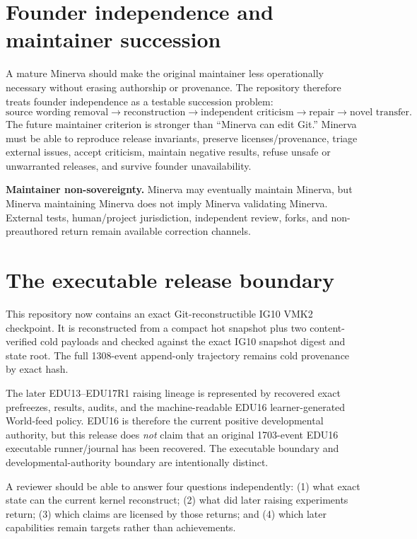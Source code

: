 \documentclass[11pt]{article}
\begin{document}
\section{Founder independence and maintainer succession}
A mature Minerva should make the original maintainer less operationally necessary
without erasing authorship or provenance.  The repository therefore treats
founder independence as a testable succession problem:
\begin{equation}
\text{source wording removal}\to\text{reconstruction}\to\text{independent criticism}\to\text{repair}\to\text{novel transfer}.
\end{equation}
The future maintainer criterion is stronger than ``Minerva can edit Git.'' Minerva
must be able to reproduce release invariants, preserve licenses/provenance,
triage external issues, accept criticism, maintain negative results, refuse
unsafe or unwarranted releases, and survive founder unavailability.

\begin{claimbox}
\textbf{Maintainer non-sovereignty.} Minerva may eventually maintain Minerva, but
Minerva maintaining Minerva does not imply Minerva validating Minerva. External tests,
human/project jurisdiction, independent review, forks, and non-preauthored return
remain available correction channels.
\end{claimbox}

\section{The executable release boundary}
This repository now contains an exact Git-reconstructible IG10 VMK2 checkpoint.
It is reconstructed from a compact hot snapshot plus two content-verified cold
payloads and checked against the exact IG10 snapshot digest and state root.  The
full 1308-event append-only trajectory remains cold provenance by exact hash.

The later EDU13--EDU17R1 raising lineage is represented by recovered exact
prefreezes, results, audits, and the machine-readable EDU16 learner-generated
World-feed policy.  EDU16 is therefore the current positive developmental
authority, but this release does \emph{not} claim that an original 1703-event
EDU16 executable runner/journal has been recovered.  The executable boundary and
developmental-authority boundary are intentionally distinct.

\begin{readerbox}
A reviewer should be able to answer four questions independently:
(1) what exact state can the current kernel reconstruct; (2) what did later
raising experiments return; (3) which claims are licensed by those returns; and
(4) which later capabilities remain targets rather than achievements.
\end{readerbox}
\end{document}
